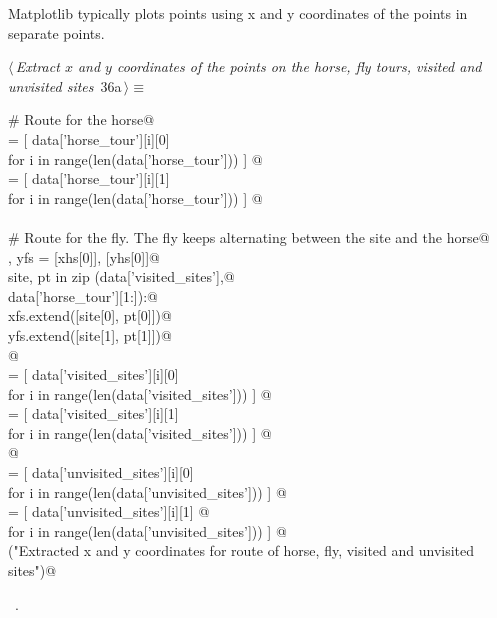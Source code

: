 \documentclass[11.5pt]{report}
\begin{document}
\vspace{-0.8cm}\newchunk Matplotlib typically plots points using x and y coordinates of the points in separate points. 

\begin{flushleft} \small\label{scrap44}\raggedright\small
{} $\langle\,${\itshape Extract $x$ and $y$ coordinates of the points on the horse, fly tours, visited and unvisited sites}\nobreak\ {\footnotesize {36a}}$\,\rangle\equiv$
\vspace{-1ex}
\begin{list}{}{} \item
\mbox{}\verb@# Route for the horse@\\
\mbox{}\verb@xhs = [ data['horse_tour'][i][0] \@\\
\mbox{}\verb@          for i in range(len(data['horse_tour']))  ]    @\\
\mbox{}\verb@yhs = [ data['horse_tour'][i][1] \@\\
\mbox{}\verb@          for i in range(len(data['horse_tour']))  ]    @\\
\mbox{}\verb@@\\
\mbox{}\verb@# Route for the fly. The fly keeps alternating between the site and the horse@\\
\mbox{}\verb@xfs , yfs = [xhs[0]], [yhs[0]]@\\
\mbox{}\verb@for site, pt in zip (data['visited_sites'],@\\
\mbox{}\verb@                     data['horse_tour'][1:]):@\\
\mbox{}\verb@    xfs.extend([site[0], pt[0]])@\\
\mbox{}\verb@    yfs.extend([site[1], pt[1]])@\\
\mbox{}\verb@        @\\
\mbox{}\verb@xvisited = [ data['visited_sites'][i][0] \@\\
\mbox{}\verb@               for i in range(len(data['visited_sites']))  ]    @\\
\mbox{}\verb@yvisited = [ data['visited_sites'][i][1] \@\\
\mbox{}\verb@               for i in range(len(data['visited_sites']))  ]    @\\
\mbox{}\verb@    @\\
\mbox{}\verb@xunvisited = [ data['unvisited_sites'][i][0] \@\\
\mbox{}\verb@                 for i in range(len(data['unvisited_sites']))  ]    @\\
\mbox{}\verb@yunvisited = [ data['unvisited_sites'][i][1] @\\
\mbox{}\verb@                 for i in range(len(data['unvisited_sites'])) ]    @\\
\mbox{}\verb@debug("Extracted x and y coordinates for route of horse, fly, visited and unvisited sites")@\\
\mbox{}\verb@@{\NWsep}
\end{list}
\vspace{-1.5ex}
\footnotesize
\begin{list}{}{\setlength{\itemsep}{-\parsep}\setlength{\itemindent}{-\leftmargin}}
\item \NWtxtMacroRefIn\ .


\end{list}
\end{flushleft}
\end{document}
